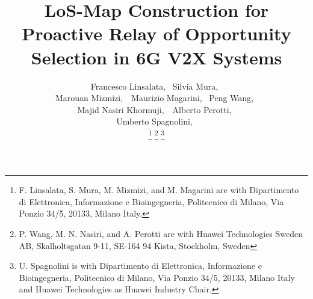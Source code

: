 \documentclass[journal]{IEEEtran}
\begin{document}
\title{LoS-Map Construction for Proactive Relay of Opportunity Selection in 6G V2X Systems}



\author{Francesco Linsalata,~
        Silvia Mura,~\\~Marouan Mizmizi,~~Maurizio Magarini,~
        Peng Wang,~~\\Majid Nasiri Khormuji,~~Alberto Perotti,~
        \\Umberto Spagnolini,~
        
\thanks{F. Linsalata, S. Mura, M. Mizmizi,  and M. Magarini are with Dipartimento di Elettronica, Informazione e Bioingegneria, Politecnico di Milano, Via Ponzio 34/5, 20133, Milano
Italy.}
\thanks{P. Wang, M. N. Nasiri, and A. Perotti are with Huawei Technologies Sweden AB, Skalholtsgatan 9-11, SE-164 94 Kista, Stockholm, Sweden}
\thanks{U. Spagnolini is with Dipartimento di Elettronica, Informazione e Bioingegneria, Politecnico di Milano, Via Ponzio 34/5, 20133, Milano Italy and Huawei Technologies as Huawei Industry Chair.}}

\maketitle
\end{document}
